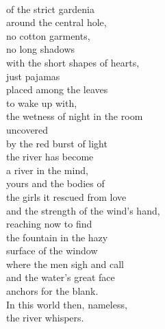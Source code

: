 \documentclass[smalldemyvopaper,11pt,twoside,onecolumn,openright,extrafontsizes]{memoir}
\begin{document}
\\of the strict gardenia
\\around the central hole,
\\no cotton garments,
\\no long shadows
\\with the short shapes of hearts,
\\just pajamas
\\placed among the leaves
\\to wake up with,
\\the wetness of night in the room
\\uncovered
\\by the red burst of light
\\the river has become
\\a river in the mind,
\\yours and the bodies of
\\the girls it rescued from love
\\and the strength of the wind's hand,
\\reaching now to find
\\the fountain in the hazy
\\surface of the window
\\where the men sigh and call
\\and the water's great face
\\anchors for the blank.
\\In this world then, nameless,
\\the river whispers.
\end{document}
